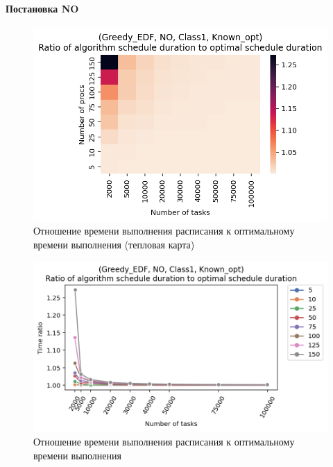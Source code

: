 \paragraph{Постановка NO}

\begin{figure}[!htbp]
    \centering
    \includegraphics[width=\textwidth]{imgs/ideal_1/NO_EDF/th.png}
    \caption{Отношение времени выполнения расписания к оптимальному времени выполнения (тепловая карта)}
    \label{fig:NO-EDF-times-heatmap}
\end{figure}

\begin{figure}[!htbp]
    \centering
    \includegraphics[width=\textwidth]{imgs/ideal_1/NO_EDF/gr_amalgamated.png}
    \caption{Отношение времени выполнения расписания к оптимальному времени выполнения} 
    \label{fig:NO-EDF-times-compiled}
\end{figure}

